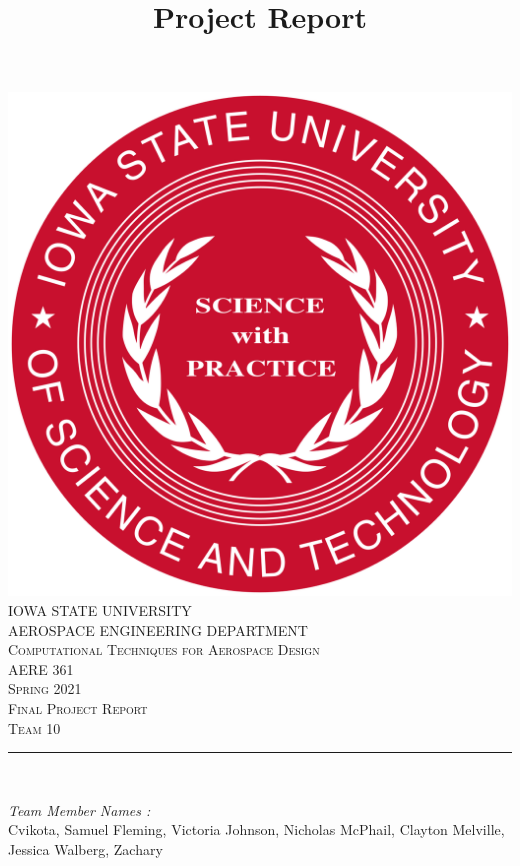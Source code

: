 \documentclass[12pt]{article}
\begin{document}
\title{Project Report}

\begin{titlepage}
	\centering
    \vspace*{0.5 cm}
    \includegraphics[scale = 0.11]{isu_seal.png}\\[1.0 cm]	%
    \textsc{\LARGE IOWA STATE UNIVERSITY}\\[2.0 cm]
    \textsc{\large AEROSPACE ENGINEERING DEPARTMENT}\\[0.2 cm]
    \textsc{\large Computational Techniques for Aerospace Design}\\[0.2 cm]
	\textsc{\Large AERE 361}\\[0.5 cm]				%
	\textsc{\Large Spring 2021}\\[0.5 cm]				%
	\textsc{\Large Final Project Report}\\[0.2 cm]
	\textsc{\Large Team 10}\\[0.2 cm]
	\rule{\linewidth}{0.2 mm} \\[0.4 cm]
	
	
	\begin{minipage}{0.8\textwidth}
		
			\begin{flushleft} 
			\emph{Team Member Names :} \\
			Cvikota, Samuel\linebreak
			Fleming, Victoria\linebreak
			Johnson, Nicholas\linebreak
			McPhail, Clayton\linebreak
			Melville, Jessica\linebreak
			Walberg, Zachary\linebreak
			

\end{flushleft}
\end{minipage}
\end{titlepage}
\end{document}
